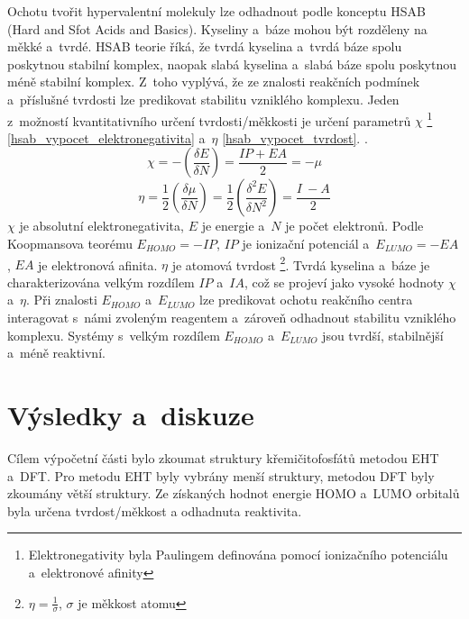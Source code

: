 \documentclass[
  printed, %
  table,   %
  lof,     %
  lot,     %
  oneside,
]{fithesis3}
\begin{document}
Ochotu tvořit hypervalentní molekuly lze odhadnout podle konceptu HSAB (Hard and Sfot Acids and Basics). Kyseliny a~báze mohou být rozděleny na měkké a~tvrdé. HSAB teorie říká, že tvrdá kyselina a~tvrdá báze spolu poskytnou stabilní komplex, naopak slabá kyselina a~slabá báze spolu poskytnou méně stabilní komplex. Z~toho vyplývá, že ze znalosti reakčních podmínek a~příslušné tvrdosti lze predikovat stabilitu vzniklého komplexu. Jeden z~možností kvantitativního určení tvrdosti/měkkosti je určení parametrů $\chi$ \footnote{Elektronegativity byla Paulingem definována pomocí ionizačního potenciálu a~elektronové afinity} \ref{hsab_vypocet_elektronegativita} a~$\eta$ \ref{hsab_vypocet_tvrdost}. \cite{hsabclanek}. 
\begin{equation}
\chi = - \left( \frac{\delta E}{\delta N} \right) = \frac{IP + EA}{2} = -\mu
\label{hsab_vypocet_elektronegativita}
\end{equation} 
\begin{equation}
\eta = \frac{1}{2} \left( \frac{\delta \mu}{\delta N} \right) = \frac{1}{2}\left( \frac{\delta^2 E}{\delta N^2} \right) = \frac{I~- A}{2}
\label{hsab_vypocet_tvrdost}
\end{equation} 
$\chi$ je absolutní elektronegativita, $E$ je energie a~$N$ je počet elektronů. \cite{hsabwatoc} Podle Koopmansova teorému $E_{HOMO} = - IP$, $IP$ je ionizační potenciál a~$E_{LUMO} = -EA$, $EA$ je elektronová afinita.\cite{kratochvilexcerpta} $\eta$ je atomová tvrdost \footnote{$\eta = \frac{1}{\sigma}$, $\sigma$ je měkkost atomu}.\cite{pearson1986absolute} Tvrdá kyselina a~báze je charakterizována velkým rozdílem $IP$ a~$IA$, což se projeví jako vysoké hodnoty $\chi$ a~$\eta$. Při znalosti $E_{HOMO}$ a~$E_{LUMO}$ lze predikovat ochotu reakčního centra interagovat s~námi zvoleným reagentem a~zároveň odhadnout stabilitu vzniklého komplexu. Systémy s~velkým rozdílem $E_{HOMO}$ a~$E_{LUMO}$ jsou tvrdší, stabilnější a~méně reaktivní.\cite{hsabwatoc}




\chapter{Výsledky a~diskuze}
Cílem výpočetní části bylo zkoumat struktury křemičitofosfátů metodou EHT a~DFT. Pro metodu EHT byly vybrány menší struktury, metodou DFT byly zkoumány větší struktury. Ze získaných hodnot energie HOMO a~LUMO orbitalů byla určena tvrdost/měkkost a odhadnuta reaktivita.
\end{document}
